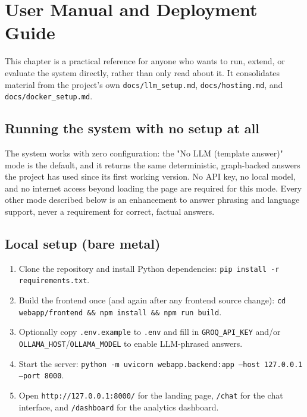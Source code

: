 \chapter{User Manual and Deployment Guide}
\label{ch:user-manual-and-deployment-guide}
This chapter is a practical reference for anyone who wants to run, extend, or evaluate the system directly, rather than only read about it. It consolidates material from the project's own \texttt{docs/\allowbreak{}llm\_\allowbreak{}setup.md}, \texttt{docs/\allowbreak{}hosting.md}, and \texttt{docs/\allowbreak{}docker\_\allowbreak{}setup.md}.

\section{Running the system with no setup at all}
The system works with zero configuration: the "No LLM (template answer)" mode is the default, and it returns the same deterministic, graph-backed answers the project has used since its first working version. No API key, no local model, and no internet access beyond loading the page are required for this mode. Every other mode described below is an enhancement to answer phrasing and language support, never a requirement for correct, factual answers.

\section{Local setup (bare metal)}
\begin{enumerate}
\item Clone the repository and install Python dependencies: \texttt{pip install -r requirements.txt}.
\item Build the frontend once (and again after any frontend source change): \texttt{cd webapp/\allowbreak{}frontend \&\& npm install \&\& npm run build}.
\item Optionally copy \texttt{.env.example} to \texttt{.env} and fill in \texttt{GROQ\_\allowbreak{}API\_\allowbreak{}KEY} and/or \texttt{OLLAMA\_\allowbreak{}HOST}/\texttt{OLLAMA\_\allowbreak{}MODEL} to enable LLM-phrased answers.
\item Start the server: \texttt{python -m uvicorn webapp.backend:app --host 127.0.0.1 --port 8000}.
\item Open \texttt{http:/\allowbreak{}/\allowbreak{}127.0.0.1:8000/\allowbreak{}} for the landing page, \texttt{/\allowbreak{}chat} for the chat interface, and \texttt{/\allowbreak{}dashboard} for the analytics dashboard.
\end{enumerate}
